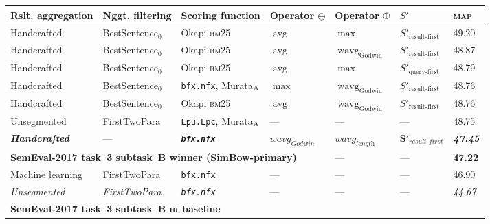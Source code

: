 \documentclass[
  digital, %
  notable, %
  lof,     %
  lot,     %
  nopalatino, color
]{fithesis3}
\newenvironment{liningfigs}{\renewcommand*{\rmdefault}{zpltlf}\normalfont}{}
\newcommand{\op}[1]{\ensuremath{\operatorname{#1}}}
\newcommand{\avg}{\op{avg}}
\newcommand{\wavg}{\op{wavg}}
\def\abbr#1{\textsc{\MakeLowercase{#1}}}
\newcommand{\omid}{\rotatebox[origin=c]{-90}{$\ominus$}}
\begin{document}
\begin{table}
\centering
\begin{liningfigs}
\begin{tabular}{lllllll}
Rslt. aggregation &
  Nggt. filtering &
  Scoring function &
  Operator $\ominus$\index{.ominus@$\ominus $} &
  Operator $\omid$\index{.omid@$\kern .2ex\omid $} &
  $S'$\index{.s'@$S'$} &
  \abbr{MAP}\index{map@\abbr {MAP}} \\ \toprule
Handcrafted &
  BestSentence$_0$\index{.bestsentence@BestSentence${}_l$} &
  Okapi \abbr{BM}25 &
  $\avg$ &
  $\max$ &
  $S'_{\textrm{result-first}}$ &
  49.20 \\
Handcrafted &
  BestSentence$_0$ &
  Okapi \abbr{BM}25 &
  $\avg$ &
  $\wavg_{\textrm{Godwin}}$\index{.wavgGodwin@$\wavg_{\textrm{Godwin}}$} &
  $S'_{\textrm{result-first}}$ &
  \index{.s'resultfirst@$S'_{\text  {result-first}}$}
  48.87 \\
Handcrafted &
  BestSentence$_0$ &
  Okapi \abbr{BM}25 &
  $\avg$ &
  $\max$ &
  $S'_{\textrm{query-first}}$ &
  \index{.s'queryfirst@$S'_{\text  {query-first}}$}
  48.79 \\
Handcrafted &
  BestSentence$_0$ &
  \texttt{bfx.nfx}, Murata$_{\textrm A}$\index{.murataa@Murata$_{\textrm A}$} &
  $\max$ &
  $\wavg_{\textrm{Godwin}}$ &
  $S'_{\textrm{result-first}}$ &
  48.76 \\
Handcrafted &
  BestSentence$_0$ &
  Okapi \abbr{BM}25 &
  $\avg$ &
  $\wavg_{\textrm{Godwin}}$ &
  $S'_{\textrm{result-first}}$ &
  48.76 \\
Unsegmented &
  FirstTwoPara\index{.firsttwopara@FirstTwoPara} &
  \texttt{Lpu.Lpc}, Murata$_{\textrm A}$\index{.murataa@Murata$_{\textrm A}$} &
  --- &
  --- &
  --- &
  48.75 \\
\bfseries\itshape Handcrafted &
  --- &
  \bfseries\itshape\texttt{bfx.nfx} &
  \bfseries$\textit{wavg}_{\textit{Godwin}}$ &
  \bfseries$\textit{wavg}_{\textit{length}}$ &
  \bfseries$\bm S'_{\textit{result-first}}$ &
  \bfseries\itshape47.45 \\
\multicolumn{4}{l}{\bfseries SemEval-2017 task~3 subtask~B winner (SimBow-primary)} &
  --- &
  --- &
  \bfseries47.22 \\
Machine learning &
  FirstTwoPara &
  \texttt{bfx.nfx} &
  --- &
  --- &
  --- &
  46.90 \\
\itshape Unsegmented &
  \itshape FirstTwoPara &
  \itshape\texttt{bfx.nfx} &
  --- &
  --- &
  --- &
  \itshape44.67 \\
\multicolumn{3}{l}{\bfseries SemEval-2017 task~3 subtask~B \abbr{IR}\index{ir@\protect\abbr{IR}} baseline} &

\end{tabular}
\end{liningfigs}
\end{table}
\end{document}

